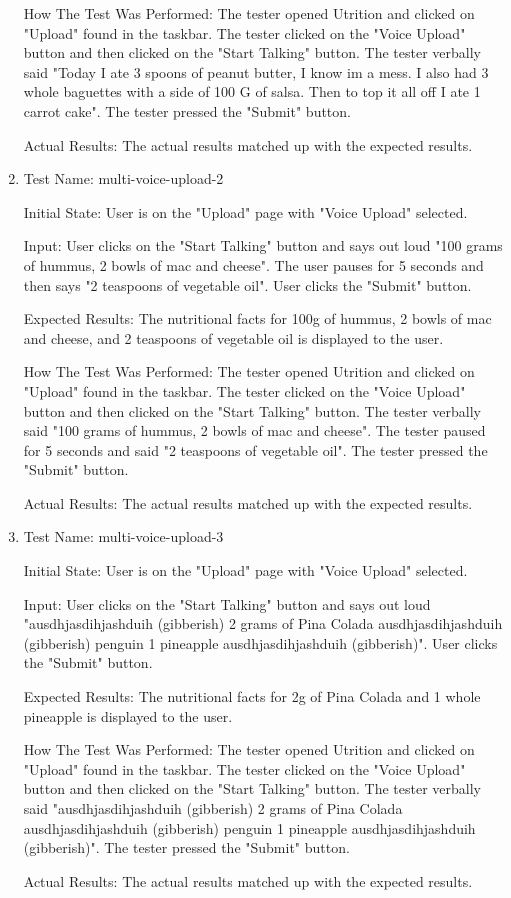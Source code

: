 \documentclass[12pt, titlepage]{article}
\begin{document}
\begin{enumerate}
		How The Test Was Performed: The tester opened Utrition and clicked on "Upload" found in the taskbar. The tester clicked on the "Voice Upload" button and then clicked on the "Start Talking" button. The tester verbally said "Today I ate 3 spoons of peanut butter, I know im a mess. I also had 3 whole baguettes with a side of 100 G of salsa. Then to top it all off I ate 1 carrot cake". The tester pressed the "Submit" button.
		
		Actual Results: The actual results matched up with the expected results.
		
		\item{Test Name: multi-voice-upload-2}
		
		Initial State: User is on the "Upload" page with "Voice Upload" selected.
		
		Input: User clicks on the "Start Talking" button and says out loud "100 grams of hummus, 2 bowls of mac and cheese". The user pauses for 5 seconds and then says "2 teaspoons of vegetable oil". User clicks the "Submit" button.
		
		Expected Results: The nutritional facts for 100g of hummus, 2 bowls of mac and cheese, and 2 teaspoons of vegetable oil is displayed to the user.
		
		How The Test Was Performed: The tester opened Utrition and clicked on "Upload" found in the taskbar. The tester clicked on the "Voice Upload" button and then clicked on the "Start Talking" button. The tester verbally said "100 grams of hummus, 2 bowls of mac and cheese". The tester paused for 5 seconds and said "2 teaspoons of vegetable oil". The tester pressed the "Submit" button.
		
		Actual Results: The actual results matched up with the expected results.
		
		\item{Test Name: multi-voice-upload-3}
		
		Initial State: User is on the "Upload" page with "Voice Upload" selected.
		
		Input: User clicks on the "Start Talking" button and says out loud "ausdhjasdihjashduih (gibberish) 2 grams of Pina Colada ausdhjasdihjashduih (gibberish) penguin 1 pineapple ausdhjasdihjashduih (gibberish)". User clicks the "Submit" button.
		
		Expected Results: The nutritional facts for 2g of Pina Colada and 1 whole pineapple is displayed to the user.
		
		How The Test Was Performed: The tester opened Utrition and clicked on "Upload" found in the taskbar. The tester clicked on the "Voice Upload" button and then clicked on the "Start Talking" button. The tester verbally said "ausdhjasdihjashduih (gibberish) 2 grams of Pina Colada ausdhjasdihjashduih (gibberish) penguin 1 pineapple ausdhjasdihjashduih (gibberish)". The tester pressed the "Submit" button.
		
		Actual Results: The actual results matched up with the expected results.
		
	\end{enumerate}
\end{document}
